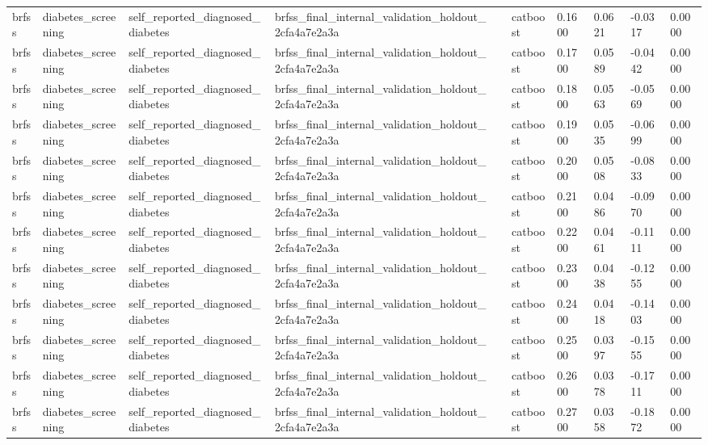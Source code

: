 \begin{tabular}{llllllllll}
brfss & diabetes\_screening & self\_reported\_diagnosed\_diabetes & brfss\_final\_internal\_validation\_holdout\_2cfa4a7e2a3a &  & catboost & 0.1600 & 0.0621 & -0.0317 & 0.0000 \\
brfss & diabetes\_screening & self\_reported\_diagnosed\_diabetes & brfss\_final\_internal\_validation\_holdout\_2cfa4a7e2a3a &  & catboost & 0.1700 & 0.0589 & -0.0442 & 0.0000 \\
brfss & diabetes\_screening & self\_reported\_diagnosed\_diabetes & brfss\_final\_internal\_validation\_holdout\_2cfa4a7e2a3a &  & catboost & 0.1800 & 0.0563 & -0.0569 & 0.0000 \\
brfss & diabetes\_screening & self\_reported\_diagnosed\_diabetes & brfss\_final\_internal\_validation\_holdout\_2cfa4a7e2a3a &  & catboost & 0.1900 & 0.0535 & -0.0699 & 0.0000 \\
brfss & diabetes\_screening & self\_reported\_diagnosed\_diabetes & brfss\_final\_internal\_validation\_holdout\_2cfa4a7e2a3a &  & catboost & 0.2000 & 0.0508 & -0.0833 & 0.0000 \\
brfss & diabetes\_screening & self\_reported\_diagnosed\_diabetes & brfss\_final\_internal\_validation\_holdout\_2cfa4a7e2a3a &  & catboost & 0.2100 & 0.0486 & -0.0970 & 0.0000 \\
brfss & diabetes\_screening & self\_reported\_diagnosed\_diabetes & brfss\_final\_internal\_validation\_holdout\_2cfa4a7e2a3a &  & catboost & 0.2200 & 0.0461 & -0.1111 & 0.0000 \\
brfss & diabetes\_screening & self\_reported\_diagnosed\_diabetes & brfss\_final\_internal\_validation\_holdout\_2cfa4a7e2a3a &  & catboost & 0.2300 & 0.0438 & -0.1255 & 0.0000 \\
brfss & diabetes\_screening & self\_reported\_diagnosed\_diabetes & brfss\_final\_internal\_validation\_holdout\_2cfa4a7e2a3a &  & catboost & 0.2400 & 0.0418 & -0.1403 & 0.0000 \\
brfss & diabetes\_screening & self\_reported\_diagnosed\_diabetes & brfss\_final\_internal\_validation\_holdout\_2cfa4a7e2a3a &  & catboost & 0.2500 & 0.0397 & -0.1555 & 0.0000 \\
brfss & diabetes\_screening & self\_reported\_diagnosed\_diabetes & brfss\_final\_internal\_validation\_holdout\_2cfa4a7e2a3a &  & catboost & 0.2600 & 0.0378 & -0.1711 & 0.0000 \\
brfss & diabetes\_screening & self\_reported\_diagnosed\_diabetes & brfss\_final\_internal\_validation\_holdout\_2cfa4a7e2a3a &  & catboost & 0.2700 & 0.0358 & -0.1872 & 0.0000 \\

\end{tabular}
